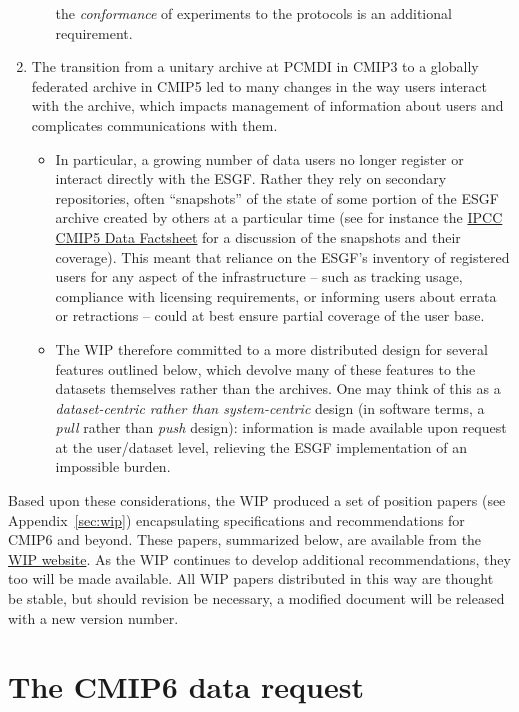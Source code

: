 \documentclass[gmd,manuscript]{copernicus}
\newcommand{\pipref}[1] {\citep{ref:#1}}
\newcommand{\appref}[1] {\mbox{Appendix \ref{sec:#1}}}
\begin{document}
\begin{enumerate}
\begin{itemize}
   the \emph{conformance} of experiments to the protocols
   \pipref{lawrenceetal2012} is an additional requirement.
  \end{itemize}
\item\label{snap} The transition from a unitary archive at PCMDI in
  CMIP3 to a globally federated archive in CMIP5 led to many changes
  in the way users interact with the archive, which impacts management
  of information about users and complicates communications with them.
  \begin{itemize}
  \item In particular, a growing number of data users no longer
    register or interact directly with the ESGF. Rather they rely on
    secondary repositories, often ``snapshots'' of the state of some
    portion of the ESGF archive created by others at a particular time
    (see for instance the \href{https://goo.gl/34AtW6}{IPCC CMIP5 Data
      Factsheet} for a discussion of the snapshots and their
    coverage). This meant that reliance on the ESGF's inventory of
    registered users for any aspect of the infrastructure -- such as
    tracking usage, compliance with licensing requirements, or
    informing users about errata or retractions -- could at best
    ensure partial coverage of the user base.
  \item The WIP therefore committed to a more distributed design for
    several features outlined below, which devolve many of these
    features to the datasets themselves rather than the archives. One
    may think of this as a \emph{dataset-centric rather than
      system-centric} design (in software terms, a \emph{pull} rather
    than \emph{push} design): information is made available upon
    request at the user/dataset level, relieving the ESGF
    implementation of an impossible burden.
  \end{itemize}
\end{enumerate}

Based upon these considerations, the WIP produced a set of position
papers (see \appref{wip}) encapsulating specifications and
recommendations for CMIP6 and beyond. These papers, summarized below,
are available from the
\href{https://www.earthsystemcog.org/projects/wip/}{WIP website}. As
the WIP continues to develop additional recommendations, they too will
be made available. All WIP papers distributed in this way are thought
be stable, but should revision be necessary, a modified document will
be released with a new version number.

\section{The CMIP6 data request}
\label{sec:dreq}
\end{document}
